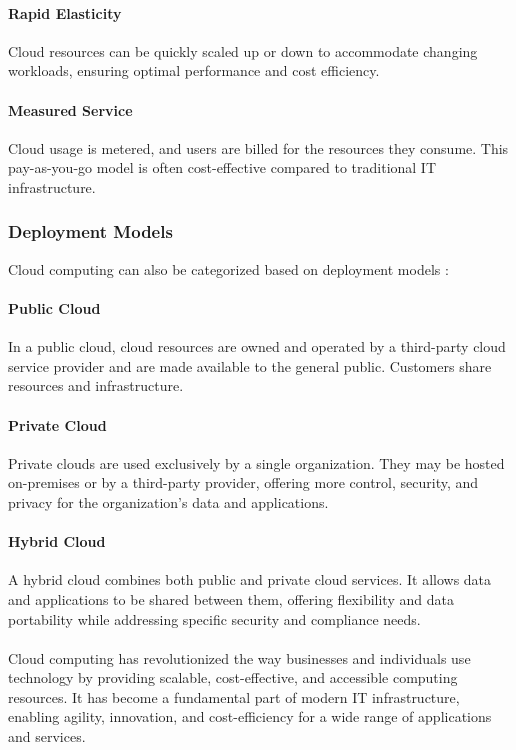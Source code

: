 \paragraph{Rapid Elasticity}

Cloud resources can be quickly scaled up or down to accommodate changing workloads, 
ensuring optimal performance and cost efficiency.

\paragraph{Measured Service} 
Cloud usage is metered, and users are billed for the resources they consume. 
This pay-as-you-go model is often cost-effective compared to traditional IT infrastructure.


\subsubsection{Deployment Models}
Cloud computing can also be categorized based on deployment models \cite{patelCloudComputingDeployment2021}:

\paragraph{Public Cloud}
In a public cloud, cloud resources are owned and operated by a third-party cloud service provider and 
are made available to the general public. 
Customers share resources and infrastructure.

\paragraph{Private Cloud}
Private clouds are used exclusively by a single organization. 
They may be hosted on-premises or by a third-party provider, offering more control, security, 
and privacy for the organization's data and applications.

\paragraph{Hybrid Cloud}
A hybrid cloud combines both public and private cloud services. 
It allows data and applications to be shared between them, 
offering flexibility and data portability while addressing specific security and compliance needs.
\\
\\
Cloud computing has revolutionized the way businesses and individuals use technology by providing scalable, 
cost-effective, and accessible computing resources. 
It has become a fundamental part of modern IT infrastructure, enabling agility, innovation, 
and cost-efficiency for a wide range of applications and services.

